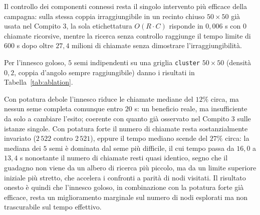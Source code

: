 Il controllo dei componenti connessi resta il singolo intervento più efficace della campagna: sulla stessa coppia irraggiungibile in un recinto chiuso $50\times50$ già usata nel Compito 3, la sola etichettatura $O(R \cdot C)$ risponde in $0{,}006$ s con $0$ chiamate ricorsive, mentre la ricerca senza controllo raggiunge il tempo limite di $600$ s dopo oltre $27{,}4$ milioni di chiamate senza dimostrare l'irraggiungibilità.

Per l'innesco goloso, $5$ semi indipendenti su una griglia \texttt{cluster} $50\times50$ (densità $0{,}2$, coppia d'angolo sempre raggiungibile) danno i risultati in Tabella~\ref{tab:ablation}.

\begin{table}[H]
\centering
{}
\caption{Effetto dell'innesco goloso del limite superiore su $5$ semi indipendenti, con e senza potatura forte.}
\label{tab:ablation}
\end{table}

Con potatura debole l'innesco riduce le chiamate mediane del $12\%$ circa, ma nessun seme completa comunque entro $20$ s: un beneficio reale, ma insufficiente da solo a cambiare l'esito; coerente con quanto già osservato nel Compito 3 sulle istanze singole. Con potatura forte il numero di chiamate resta sostanzialmente invariato ($2\,522$ contro $2\,521$), eppure il tempo mediano scende del $27\%$ circa: la mediana dei $5$ semi è dominata dal seme più difficile, il cui tempo passa da $16{,}0$ a $13{,}4$ s nonostante il numero di chiamate resti quasi identico, segno che il guadagno non viene da un albero di ricerca più piccolo, ma da un limite superiore iniziale più stretto, che accelera i confronti a parità di nodi visitati. Il risultato onesto è quindi che l'innesco goloso, in combinazione con la potatura forte già efficace, resta un miglioramento marginale sul numero di nodi esplorati ma non trascurabile sul tempo effettivo.

